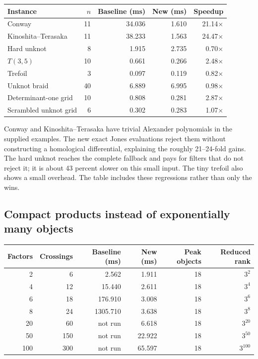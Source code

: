 \documentclass[11pt,letterpaper]{article}
\theoremstyle{definition}\newtheorem{definition}[theorem]{Definition}
\theoremstyle{remark}\newtheorem{remark}[theorem]{Remark}
\begin{document}
\begin{center}
\small
\setlength{\tabcolsep}{5pt}
\begin{tabular}{lrrrr}
\toprule
Instance & $n$ & Baseline (ms) & New (ms) & Speedup\\
\midrule
Conway & 11 & 34.036 & 1.610 & 21.14$\times$\\
Kinoshita--Terasaka & 11 & 38.233 & 1.563 & 24.47$\times$\\
Hard unknot & 8 & 1.915 & 2.735 & 0.70$\times$\\
$T(3,5)$ & 10 & 0.661 & 0.266 & 2.48$\times$\\
Trefoil & 3 & 0.097 & 0.119 & 0.82$\times$\\
Unknot braid & 40 & 6.889 & 6.995 & 0.98$\times$\\
Determinant-one grid & 10 & 0.808 & 0.281 & 2.87$\times$\\
Scrambled unknot grid & 6 & 0.302 & 0.283 & 1.07$\times$\\
\bottomrule
\end{tabular}
\end{center}

Conway and Kinoshita--Terasaka have trivial Alexander polynomials in the supplied
examples. The new exact Jones evaluations reject them without constructing a
homological differential, explaining the roughly 21--24-fold gains. The hard
unknot reaches the complete fallback and pays for filters that do not reject it;
it is about 43 percent slower on this small input. The tiny trefoil also shows a
small overhead. The table includes these regressions rather than only the wins.

\subsection{Compact products instead of exponentially many objects}

\begin{center}
\small
\setlength{\tabcolsep}{5pt}
\begin{tabular}{rrrrrr}
\toprule
Factors & Crossings & Baseline (ms) & New (ms) & Peak objects & Reduced rank\\
\midrule
2 & 6 & 2.562 & 1.911 & 18 & $3^{2}$\\
4 & 12 & 15.440 & 2.611 & 18 & $3^{4}$\\
6 & 18 & 176.910 & 3.008 & 18 & $3^{6}$\\
8 & 24 & 1305.710 & 3.638 & 18 & $3^{8}$\\
20 & 60 & not run & 6.618 & 18 & $3^{20}$\\
50 & 150 & not run & 22.922 & 18 & $3^{50}$\\
100 & 300 & not run & 65.597 & 18 & $3^{100}$\\
\bottomrule
\end{tabular}
\end{center}
\end{document}

